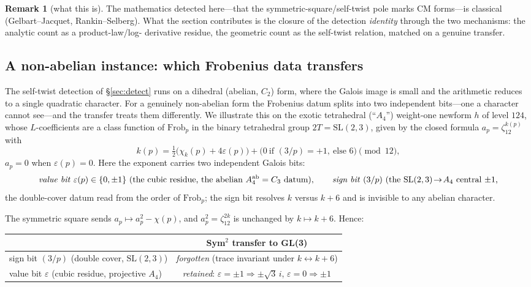\documentclass[11pt]{article}
\theoremstyle{definition}
\newtheorem{remark}[theorem]{Remark}
\begin{document}
\begin{remark}[what this is]
The mathematics detected here---that the symmetric-square/self-twist pole marks CM forms---is
classical (Gelbart--Jacquet, Rankin--Selberg). What the section contributes is the closure of the
detection \emph{identity} through the two mechanisms: the analytic count as a product-law/log-
derivative residue, the geometric count as the self-twist relation, matched on a genuine transfer.
\end{remark}

\subsection{A non-abelian instance: which Frobenius data transfers}\label{sec:a4}

The self-twist detection of \S\ref{sec:detect} runs on a dihedral (abelian, $C_2$) form, where the
Galois image is small and the arithmetic reduces to a single quadratic character. For a genuinely
non-abelian form the Frobenius datum splits into two independent bits---one a character cannot
see---and the transfer treats them differently. We illustrate this on the exotic tetrahedral
(``$A_4$'') weight-one newform $h$ of level $124$, whose $L$-coefficients are a class function of
$\mathrm{Frob}_p$ in the binary tetrahedral group $2T=\mathrm{SL}(2,3)$, given by the closed formula
$a_p=\zeta_{12}^{k(p)}$ with
\[
  k(p)=\tfrac12\big(\chi_k(p)+4\varepsilon(p)\big)+\big(0\ \text{if }(3/p)=+1,\ \text{else }6\big)
  \pmod{12},
\]
$a_p=0$ when $\varepsilon(p)=0$. Here the exponent carries two independent Galois bits:
\[
  \text{\emph{value bit}}\ \varepsilon(p)\in\{0,\pm1\}\ \text{(the cubic residue, the abelian
  $A_4^{\mathrm{ab}}=C_3$ datum)},\qquad
  \text{\emph{sign bit}}\ (3/p)\ \text{(the $\mathrm{SL}(2,3)\!\to\!A_4$ central $\pm1$,}
\]
the double-cover datum read from the order of $\mathrm{Frob}_p$; the sign bit resolves $k$ versus
$k+6$ and is invisible to any abelian character.

The symmetric square sends $a_p\mapsto a_p^2-\chi(p)$, and $a_p^2=\zeta_{12}^{2k}$ is unchanged by
$k\mapsto k+6$. Hence:

\begin{center}
\begin{tabular}{lc}
\toprule
 & Sym$^2$ transfer to GL(3) \\
\midrule
sign bit $(3/p)$ (double cover, $\mathrm{SL}(2,3)$) & \emph{forgotten} (trace invariant under $k\!\leftrightarrow\!k{+}6$) \\
value bit $\varepsilon$ (cubic residue, projective $A_4$) & \emph{retained}: $\varepsilon=\pm1\Rightarrow\pm\sqrt3\,i$, $\varepsilon=0\Rightarrow\pm1$ \\
\bottomrule
\end{tabular}
\end{center}
\end{document}
